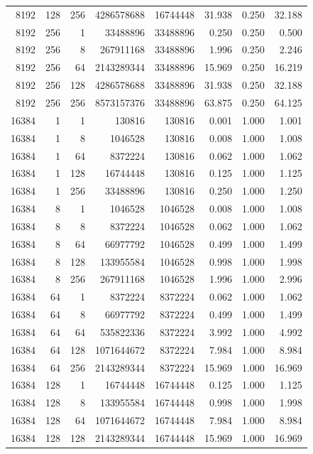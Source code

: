 \begin{longtable}{rrrrrrrr}
8192 & 128 & 256 & 4286578688 & 16744448 & 31.938 & 0.250 & 32.188\\
8192 & 256 & 1 & 33488896 & 33488896 & 0.250 & 0.250 & 0.500\\
8192 & 256 & 8 & 267911168 & 33488896 & 1.996 & 0.250 & 2.246\\
8192 & 256 & 64 & 2143289344 & 33488896 & 15.969 & 0.250 & 16.219\\
8192 & 256 & 128 & 4286578688 & 33488896 & 31.938 & 0.250 & 32.188\\
8192 & 256 & 256 & 8573157376 & 33488896 & 63.875 & 0.250 & 64.125\\
16384 & 1 & 1 & 130816 & 130816 & 0.001 & 1.000 & 1.001\\
16384 & 1 & 8 & 1046528 & 130816 & 0.008 & 1.000 & 1.008\\
16384 & 1 & 64 & 8372224 & 130816 & 0.062 & 1.000 & 1.062\\
16384 & 1 & 128 & 16744448 & 130816 & 0.125 & 1.000 & 1.125\\
16384 & 1 & 256 & 33488896 & 130816 & 0.250 & 1.000 & 1.250\\
16384 & 8 & 1 & 1046528 & 1046528 & 0.008 & 1.000 & 1.008\\
16384 & 8 & 8 & 8372224 & 1046528 & 0.062 & 1.000 & 1.062\\
16384 & 8 & 64 & 66977792 & 1046528 & 0.499 & 1.000 & 1.499\\
16384 & 8 & 128 & 133955584 & 1046528 & 0.998 & 1.000 & 1.998\\
16384 & 8 & 256 & 267911168 & 1046528 & 1.996 & 1.000 & 2.996\\
16384 & 64 & 1 & 8372224 & 8372224 & 0.062 & 1.000 & 1.062\\
16384 & 64 & 8 & 66977792 & 8372224 & 0.499 & 1.000 & 1.499\\
16384 & 64 & 64 & 535822336 & 8372224 & 3.992 & 1.000 & 4.992\\
16384 & 64 & 128 & 1071644672 & 8372224 & 7.984 & 1.000 & 8.984\\
16384 & 64 & 256 & 2143289344 & 8372224 & 15.969 & 1.000 & 16.969\\
16384 & 128 & 1 & 16744448 & 16744448 & 0.125 & 1.000 & 1.125\\
16384 & 128 & 8 & 133955584 & 16744448 & 0.998 & 1.000 & 1.998\\
16384 & 128 & 64 & 1071644672 & 16744448 & 7.984 & 1.000 & 8.984\\
16384 & 128 & 128 & 2143289344 & 16744448 & 15.969 & 1.000 & 16.969\\

\end{longtable}
